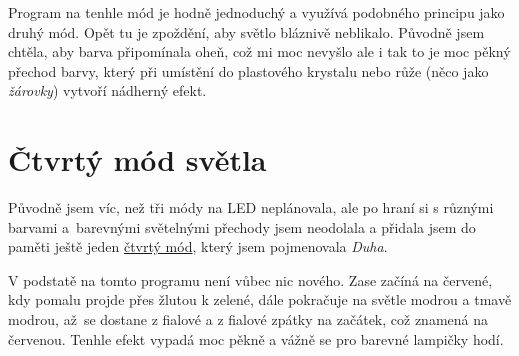 %


Program na tenhle mód je hodně jednoduchý a využívá podobného principu jako druhý mód. Opět tu je zpoždění, aby světlo bláznivě neblikalo. Původně jsem chtěla, aby barva připomínala oheň, což mi moc nevyšlo ale i tak to je moc pěkný přechod barvy, který při umístění do plastového krystalu nebo růže (něco jako \emph{žárovky}) vytvoří nádherný efekt. 

\section{Čtvrtý mód světla}
Původně jsem víc, než tři módy na LED neplánovala, ale po hraní si s různými barvami a~barevnými světelnými přechody jsem neodolala a přidala jsem do paměti ještě jeden \href{https://github.com/Nemesis-Rain/Supplements-/blob/main/4-barevne-mody/blikani-ctyri(duha).cpp}{čtvrtý mód}, který jsem pojmenovala \emph{Duha}.


%



V podstatě na tomto programu není vůbec nic nového. Zase začíná na červené, kdy pomalu projde přes žlutou k zelené, dále pokračuje na světle modrou a tmavě modrou, až~se dostane z fialové a z fialové zpátky na začátek, což znamená na červenou. Tenhle efekt vypadá moc pěkně a vážně se pro barevné lampičky hodí. 


